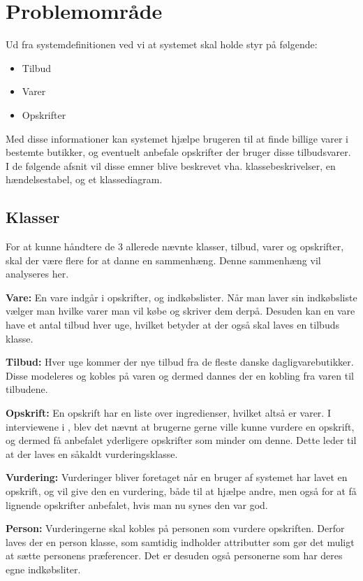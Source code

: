 \section{Problemområde}

Ud fra systemdefinitionen ved vi at systemet skal holde styr på følgende:

\begin{itemize}
	\item Tilbud
	\item Varer
	\item Opskrifter
\end{itemize}

Med disse informationer kan systemet hjælpe brugeren til at finde billige varer i bestemte butikker, og eventuelt anbefale opskrifter der bruger disse tilbudsvarer.
I de følgende afsnit vil disse emner blive beskrevet vha. klassebeskrivelser, en hændelsestabel, og et klassediagram.

\subsection{Klasser}
For at kunne håndtere de 3 allerede nævnte klasser, tilbud, varer og opskrifter, skal der være flere for at danne en sammenhæng.
Denne sammenhæng vil analyseres her.


\textbf{Vare:}
En vare indgår i opskrifter, og indkøbslister.
Når man laver sin indkøbsliste vælger man hvilke varer man vil købe og skriver dem derpå. 
Desuden kan en vare have et antal tilbud hver uge, hvilket betyder at der også skal laves en tilbuds klasse.

\textbf{Tilbud:}
Hver uge kommer der nye tilbud fra de fleste danske dagligvarebutikker. 
Disse modeleres og kobles på varen og dermed dannes der en kobling fra varen til tilbudene.

\textbf{Opskrift:}
En opskrift har en liste over ingredienser, hvilket altså er varer.
I interviewene i , blev det nævnt at brugerne gerne ville kunne vurdere en opskrift, og dermed få anbefalet yderligere opskrifter som minder om denne.
Dette leder til at der laves en såkaldt vurderingsklasse.

\textbf{Vurdering:}
Vurderinger bliver foretaget når en bruger af systemet har lavet en opskrift, og vil give den en vurdering, både til at hjælpe andre, men også for at få lignende opskrifter anbefalet, hvis man nu synes den var god.

\textbf{Person:}
Vurderingerne skal kobles på personen som vurdere opskriften. 
Derfor laves der en person klasse, som samtidig indholder attributter som gør det muligt at sætte personens præferencer.
Det er desuden også personerne som har deres egne indkøbsliter.


